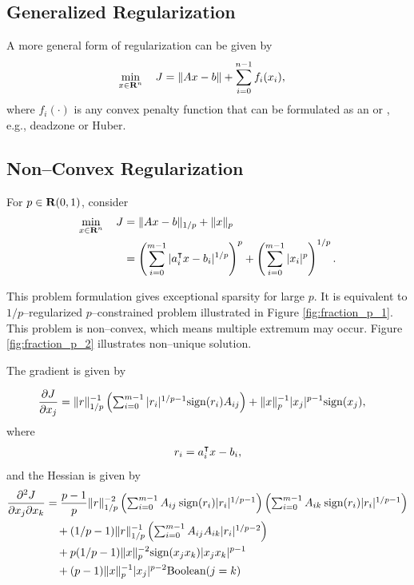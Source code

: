 \documentclass{article}
\begin{document}

\clearpage
\subsection{Generalized Regularization}

A more general form of regularization can be given by
\begin{align*}
    \min_{x\in\textbf{R}^n}\quad J &= \|Ax-b\|+\sum_{i=0}^{n-1}f_i(x_i),
\end{align*}
where $f_i(\cdot)$ is any convex penalty function that can be 
formulated as an \LP or \QP, e.g.,
deadzone or Huber.

\subsection{Non--Convex Regularization}

    For $p\in\textbf{R}(0,1)$, consider
    \begin{align*}
        \min_{x\in\textbf{R}^n}\quad J &= \|Ax-b\|_{1/p}+\|x\|_p\\
        &= \left(\sum_{i=0}^{m-1} |a_i^\intercal x-b_i|^{1/p}\right)^p
        +\left(\sum_{i=0}^{m-1}|x_i|^p\right)^{1/p}.
    \end{align*}

    This problem formulation gives exceptional sparsity for large $p$.
    It is equivalent to $1/p$--regularized $p$--constrained problem 
    illustrated in Figure \ref{fig:fraction_p_1}.
    This problem is non--convex, which means multiple extremum may occur.
    Figure \ref{fig:fraction_p_2} illustrates non--unique solution.

    The gradient is given by

    \begin{align*}
        \frac{\partial J}{\partial x_j}&=\|r\|_{1/p}^{-1}
        \left(\textstyle\sum_{i=0}^{m-1}|r_i|^{1/p-1}\text{sign}(r_i)A_{ij}\right)
        +\|x\|_p^{-1}|x_j|^{p-1}\text{sign}(x_j),
    \end{align*}
    where
    \begin{align*}
        r_i = a_i^\intercal x-b_i,
    \end{align*}
    and the Hessian is given by
    \begin{align*}
        \frac{\partial^2 J}{\partial x_j \partial x_k}&=\frac{p-1}{p}\|r\|_{1/p}^{-2}
        \left(\textstyle\sum_{i=0}^{m-1}A_{ij}\:\text{sign}(r_i)|r_i|^{1/p-1}\right)
        \left(\textstyle\sum_{i=0}^{m-1}A_{ik}\:\text{sign}(r_i)|r_i|^{1/p-1}\right)\\
        &\quad+(1/p-1)\|r\|_{1/p}^{-1}
        \left(\textstyle\sum_{i=0}^{m-1}A_{ij}A_{ik}|r_i|^{1/p-2}\right)\\
        &\quad+p(1/p-1)\|x\|_p^{-2}\text{sign}(x_jx_k)|x_jx_k|^{p-1}\\
        &\quad+(p-1)\|x\|_p^{-1}|x_j|^{p-2}\text{Boolean}(j=k)
    \end{align*}
\end{document}
